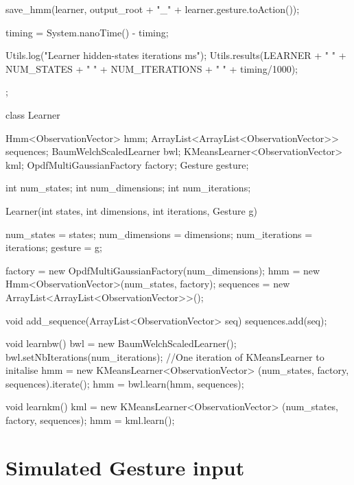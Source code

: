 \documentclass[12pt,a4,notitlepage]{report}
\renewcommand{\_}{\texttt{\symbol{95}}}
\newcommand{\<}{\texttt{\symbol{60}}}
\renewcommand{\>}{\texttt{\symbol{62}}}
\begin{document}
\begin{code}
{{{         save_hmm(learner, output_root + "_" + learner.gesture.toAction());
      }
      
        timing = System.nanoTime() - timing;
        
        Utils.log("Learner hidden-states iterations ms");
        Utils.results(LEARNER + " " + NUM_STATES + 
		    " " + NUM_ITERATIONS + " " + timing/1000);
   }
};

class Learner
{
   Hmm<ObservationVector> hmm;
   ArrayList<ArrayList<ObservationVector>> sequences;
   BaumWelchScaledLearner bwl;
   KMeansLearner<ObservationVector> kml; 
    OpdfMultiGaussianFactory factory;
    Gesture gesture;
    
   int num_states;
   int num_dimensions;
   int num_iterations;    

   Learner(int states, int dimensions, int iterations, Gesture g)
   {
      num_states = states;
      num_dimensions = dimensions;
      num_iterations = iterations;
      gesture = g;

      factory = new OpdfMultiGaussianFactory(num_dimensions);
      hmm = new Hmm<ObservationVector>(num_states, factory);
      sequences = new ArrayList<ArrayList<ObservationVector>>();
   }
   
   void add_sequence(ArrayList<ObservationVector> seq)
   {
      sequences.add(seq);
   }
   
   void learnbw()
   {
      bwl = new BaumWelchScaledLearner();
      bwl.setNbIterations(num_iterations);
      //One iteration of KMeansLearner to initalise
      hmm = new KMeansLearner<ObservationVector>
		  (num_states, factory, sequences).iterate();
      hmm = bwl.learn(hmm, sequences);
   }
   
   void learnkm()
   {
      kml = new KMeansLearner<ObservationVector>
		  (num_states, factory, sequences);
      hmm = kml.learn();
   }
}
\end{code}

\chapter{Simulated Gesture input}
\end{document}
